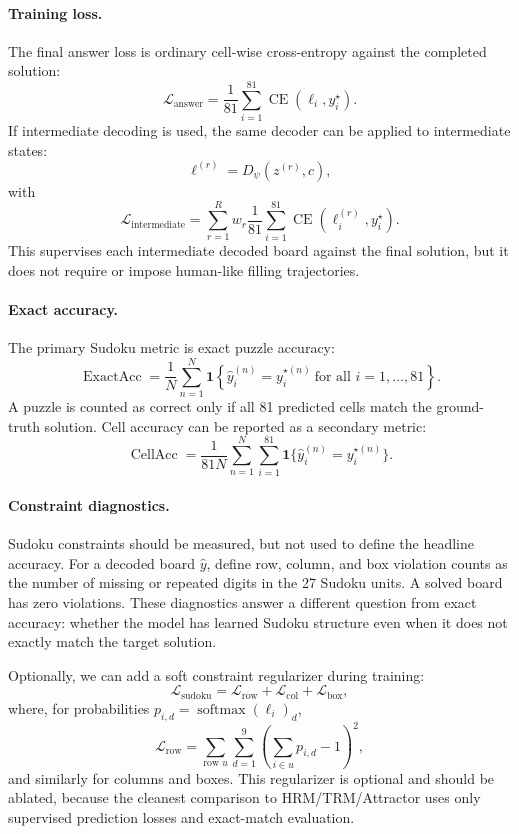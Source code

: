 \documentclass[11pt]{article}
\begin{document}
\paragraph{Training loss.}
The final answer loss is ordinary cell-wise cross-entropy against the completed solution:
\[
    \mathcal L_{\mathrm{answer}}
    =
    \frac{1}{81}
    \sum_{i=1}^{81}
    \operatorname{CE}(\ell_i,y_i^\star).
\]
If intermediate decoding is used, the same decoder can be applied to intermediate states:
\[
    \ell^{(r)}=D_\psi(z^{(r)},c),
\]
with
\[
    \mathcal L_{\mathrm{intermediate}}
    =
    \sum_{r=1}^{R}w_r
    \frac{1}{81}
    \sum_{i=1}^{81}
    \operatorname{CE}(\ell_i^{(r)},y_i^\star).
\]
This supervises each intermediate decoded board against the final solution, but it does not require or impose human-like filling trajectories.

\paragraph{Exact accuracy.}
The primary Sudoku metric is exact puzzle accuracy:
\[
    \operatorname{ExactAcc}
    =
    \frac{1}{N}
    \sum_{n=1}^{N}
    \mathbf 1
    \left\{
        \hat y^{(n)}_i = y_i^{\star(n)}
        \ \text{for all } i=1,\dots,81
    \right\}.
\]
A puzzle is counted as correct only if all 81 predicted cells match the ground-truth solution. Cell accuracy can be reported as a secondary metric:
\[
    \operatorname{CellAcc}
    =
    \frac{1}{81N}
    \sum_{n=1}^{N}
    \sum_{i=1}^{81}
    \mathbf 1\{\hat y^{(n)}_i=y_i^{\star(n)}\}.
\]

\paragraph{Constraint diagnostics.}
Sudoku constraints should be measured, but not used to define the headline accuracy. For a decoded board \(\hat y\), define row, column, and box violation counts as the number of missing or repeated digits in the 27 Sudoku units. A solved board has zero violations. These diagnostics answer a different question from exact accuracy: whether the model has learned Sudoku structure even when it does not exactly match the target solution.

Optionally, we can add a soft constraint regularizer during training:
\[
    \mathcal L_{\mathrm{sudoku}}
    =
    \mathcal L_{\mathrm{row}}
    +
    \mathcal L_{\mathrm{col}}
    +
    \mathcal L_{\mathrm{box}},
\]
where, for probabilities \(p_{i,d}=\operatorname{softmax}(\ell_i)_d\),
\[
    \mathcal L_{\mathrm{row}}
    =
    \sum_{\text{row }u}
    \sum_{d=1}^{9}
    \left(
        \sum_{i\in u}p_{i,d}-1
    \right)^2,
\]
and similarly for columns and boxes. This regularizer is optional and should be ablated, because the cleanest comparison to HRM/TRM/Attractor uses only supervised prediction losses and exact-match evaluation.
\end{document}

